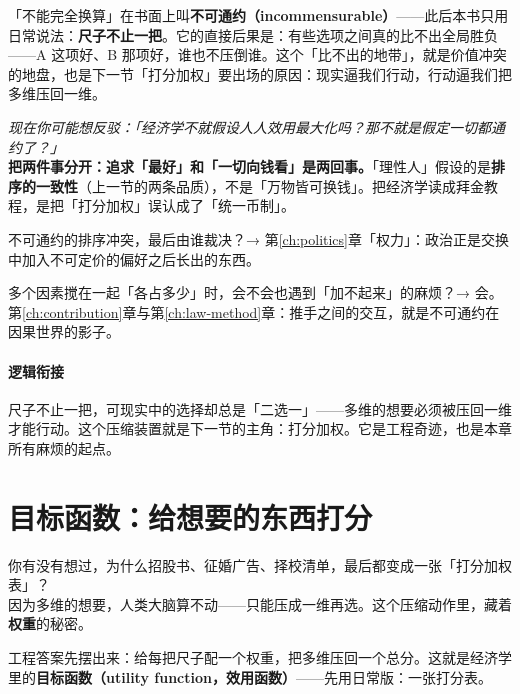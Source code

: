 \documentclass[../../main2.tex]{subfiles}
\begin{document}
	「不能完全换算」在书面上叫\textbf{不可通约（incommensurable）}——此后本书只用日常说法：\textbf{尺子不止一把}。它的直接后果是：有些选项之间真的比不出全局胜负——A 这项好、B 那项好，谁也不压倒谁。这个「比不出的地带」，就是价值冲突的地盘，也是下一节「打分加权」要出场的原因：现实逼我们行动，行动逼我们把多维压回一维。

	\begin{questionbox}
		\textit{现在你可能想反驳：「经济学不就假设人人效用最大化吗？那不就是假定一切都通约了？」}\\
		\textbf{把两件事分开：追求「最好」和「一切向钱看」是两回事。}「理性人」假设的是\textbf{排序的一致性}（上一节的两条品质），不是「万物皆可换钱」。把经济学读成拜金教程，是把「打分加权」误认成了「统一币制」。
	\end{questionbox}

	\begin{reader_anticipation}
		\item 不可通约的排序冲突，最后由谁裁决？→ 第\ref{ch:politics}章「权力」：政治正是交换中加入不可定价的偏好之后长出的东西。
		\item 多个因素搅在一起「各占多少」时，会不会也遇到「加不起来」的麻烦？→ 会。第\ref{ch:contribution}章与第\ref{ch:law-method}章：推手之间的交互，就是不可通约在因果世界的影子。
	\end{reader_anticipation}

	\paragraph*{逻辑衔接}
	尺子不止一把，可现实中的选择却总是「二选一」——多维的想要必须被压回一维才能行动。这个压缩装置就是下一节的主角：打分加权。它是工程奇迹，也是本章所有麻烦的起点。

	\section{目标函数：给想要的东西打分}
	\label{sec:goal-utility}

	\begin{readingnote}
		你有没有想过，为什么招股书、征婚广告、择校清单，最后都变成一张「打分加权表」？\\
		因为多维的想要，人类大脑算不动——只能压成一维再选。这个压缩动作里，藏着\textbf{权重}的秘密。
	\end{readingnote}

	工程答案先摆出来：给每把尺子配一个权重，把多维压回一个总分。这就是经济学里的\textbf{目标函数（utility function，效用函数）}——先用日常版：一张打分表。
\end{document}
